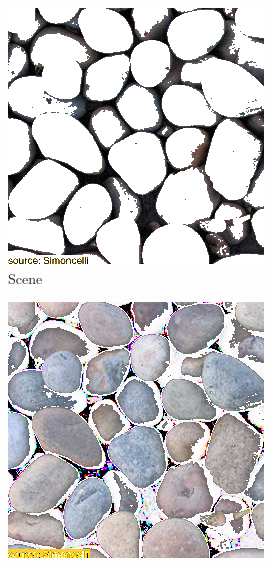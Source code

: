 \begin{figure}[ht]
\begin{subfigure}{\textwidth}
\begin{subfigure}{0.2\textwidth}
            \includegraphics[width=\textwidth]{images/01-pixels_vs_stats-bg.jpg}
            \caption*{Scene}
            \vspace*{10mm}
            \label{fig:intro_pixels_vs_stats-stats_bg}
        \end{subfigure}
        \hfill
        \begin{subfigure}{0.2\textwidth}
            \centering
            \includegraphics[width=\textwidth]{images/01-pixels_vs_stats-stats_opt.jpg}

\end{subfigure}
\end{subfigure}
\end{figure}
